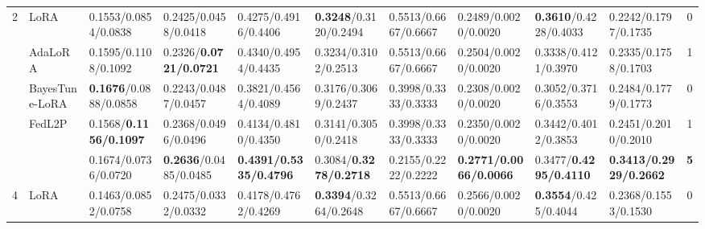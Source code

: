 \begin{table*}[t]
\begin{scriptsize}
{\begin{tabular}{c|l|l|l|l|l|l|l|l|l|c}
\multirow{5}{*}{2}  & LoRA                                   & 0.1553/0.0854/0.0838             & 0.2425/0.0458/0.0418             & 0.4275/0.4916/0.4406             & \textbf{0.3248}/0.3120/0.2494     & 0.5513/0.6667/0.6667    & 0.2489/0.0020/0.0020               & \textbf{0.3610}/0.4228/0.4033     & 0.2242/0.1797/0.1735             & 0             \\ %
                    & AdaLoRA                              & 0.1595/0.1108/0.1092             & 0.2326/\textbf{0.0721/0.0721}             & 0.4340/0.4954/0.4435              & 0.3234/0.3102/0.2513             & 0.5513/0.6667/0.6667   & 0.2504/0.0020/0.0020               & 0.3338/0.4121/0.3970              & 0.2335/0.1758/0.1703             & 1             \\ %
                    & BayesTune-LoRA                            & \textbf{0.1676}/0.0888/0.0858    & 0.2243/0.0487/0.0457             & 0.3821/0.4564/0.4089             & 0.3176/0.3069/0.2437             & 0.3998/0.3333/0.3333             & 0.2308/0.0020/0.0020               & 0.3052/0.3716/0.3553             & 0.2484/0.1779/0.1773             & 0             \\ %
                    & FedL2P                               & 0.1568/\textbf{0.1156/0.1097}             & 0.2368/0.0496/0.0496             & 0.4134/0.4810/0.4350               & 0.3141/0.3050/0.2418              & 0.3998/0.3333/0.3333             & 0.2350/0.0020/0.0020               & 0.3442/0.4012/0.3853             & 0.2451/0.2010/0.2010               & 1             \\ %
                    & \method{}                                 & 0.1674/0.0736/0.0720              & \textbf{0.2636}/0.0485/0.0485    & \textbf{0.4391/0.5335/0.4796}    & 0.3084/\textbf{0.3278/0.2718}             & 0.2155/0.2222/0.2222             & \textbf{0.2771/0.0066/0.0066}    & 0.3477/\textbf{0.4295/0.4110}              & \textbf{0.3413/0.2929/0.2662}    & \textbf{5}    \\ \hline
\multirow{5}{*}{4}  & LoRA                                   & 0.1463/0.0852/0.0758             & 0.2475/0.0332/0.0332             & 0.4178/0.4762/0.4269             & \textbf{0.3394}/0.3264/0.2648    & 0.5513/0.6667/0.6667             & 0.2566/0.0020/0.0020               & \textbf{0.3554}/0.425/0.4044     & 0.2368/0.1553/0.1530              & 0             \\ %

\end{tabular}}
\end{scriptsize}
\end{table*}
